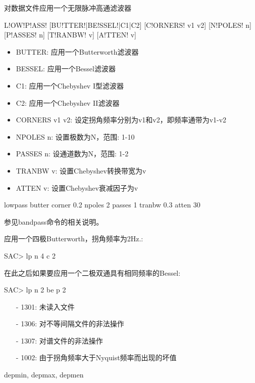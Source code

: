\label{cmd:lowpass}

对数据文件应用一个无限脉冲高通滤波器

\begin{SACSTX}
L!OW!P!ASS! [BU!TTER!|BE!SSEL!|C1|C2] [C!ORNERS! v1 v2] [N!POLES! n] [P!ASSES! n] 
    [T!RANBW! v] [A!TTEN! v]
\end{SACSTX}

\begin{itemize}
\item BUTTER: 应用一个Butterworth滤波器
\item BESSEL: 应用一个Bessel滤波器
\item C1: 应用一个Chebyshev I型滤波器
\item C2: 应用一个Chebyshev II滤波器
\item CORNERS v1 v2: 设定拐角频率分别为v1和v2，即频率通带为v1-v2
\item NPOLES n: 设置极数为N，范围: 1-10
\item PASSES n: 设通道数为N，范围: 1-2
\item TRANBW v: 设置Chebyshev转换带宽为v
\item ATTEN v: 设置Chebyshev衰减因子为v
\end{itemize}

\begin{SACDFT}
lowpass butter corner 0.2 npoles 2 passes 1 tranbw 0.3 atten 30
\end{SACDFT}

参见bandpass命令的相关说明。

应用一个四极Butterworth，拐角频率为2Hz.:
\begin{SACCode}
SAC> lp n 4 c 2
\end{SACCode}

在此之后如果要应用一个二极双通具有相同频率的Bessel:
\begin{SACCode}
SAC> lp n 2 be p 2
\end{SACCode}

\begin{itemize}
\item[-]1301: 未读入文件
\item[-]1306: 对不等间隔文件的非法操作
\item[-]1307: 对谱文件的非法操作
\item[-]1002: 由于拐角频率大于Nyquist频率而出现的坏值
\end{itemize}

depmin, depmax, depmen
